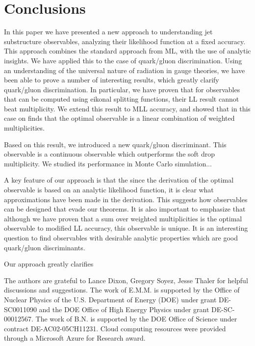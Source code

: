 \documentclass[letterpaper,11pt]{article}
\begin{document}
\section{Conclusions}
\label{sec:conc}

In this paper we have presented a new approach to understanding jet substructure observables, analyzing their likelihood function at a fixed accuracy. This approach combines the standard approach from ML, with the use of analytic insights. We have applied this to the case of quark/gluon discrimination. Using an understanding of the universal nature of radiation in gauge theories, we have been able to prove a number of interesting results, which greatly clarify quark/gluon discrimination. In particular, we have proven that for observables that can be computed using eikonal splitting functions, their LL result cannot beat multiplicity. We extend this result to MLL accuracy, and showed that in this case on finds that the optimal observable is a linear combination of weighted multiplicities.

Based on this result, we introduced a new quark/gluon discriminant. This observable is a continuous observable which outperforms the soft drop multiplicity. We studied its performance in Monte Carlo simulation...

A key feature of our approach is that the since the derivation of the optimal observable is based on an analytic likelihood function, it is clear what approximations have been made in the derivation. This suggests how observables can be designed that evade our theorems. It is also important to emphasize that although we have proven that a sum over weighted multiplicities is the optimal observable to modified LL accuracy, this observable is unique. It is an interesting question to find observables with desirable analytic properties which are good quark/gluon discriminants.


Our approach greatly clarifies 


\acknowledgments

The authors are grateful to Lance Dixon, Gregory Soyez, Jesse Thaler for helpful discussions and suggestions.
%
The work of E.M.M. is supported by the Office of Nuclear Physics of the U.S. Department of Energy (DOE) under grant DE-SC0011090 and the DOE Office of High Energy Physics under grant DE-SC-00012567.
%
The work of B.N. is supported by the DOE Office of Science under contract DE-AC02-05CH11231.
%
Cloud computing resources were provided through a Microsoft Azure for Research award.



\end{document}
